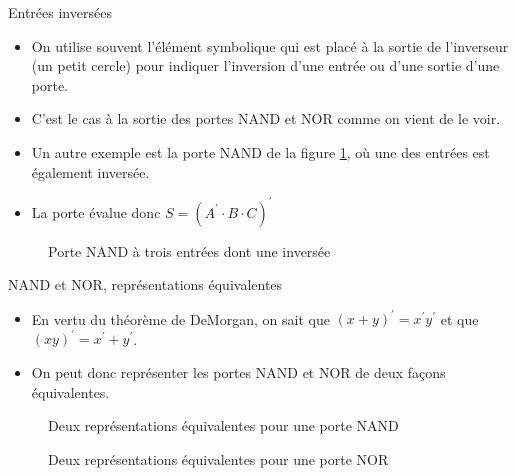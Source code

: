 \documentclass[presentation]{beamer}
\begin{document}
\begin{frame}[label={sec:orge39c8d5}]{Entrées inversées}
\begin{itemize}
\item On utilise souvent l'élément symbolique qui est placé à la sortie de l'inverseur (un petit cercle) pour indiquer l'inversion d'une entrée ou d'une sortie d'une porte.

\item C'est le cas à la sortie des portes NAND et NOR comme on vient de le voir.

\item Un autre exemple est la porte NAND de la figure \ref{fig:org8edaf9f}, où une des entrées est également inversée.

\item La porte évalue donc \(S = (A^\prime \cdot B \cdot C)^\prime\)
\end{itemize}

\begin{figure}[htbp]
\centering

\caption{\label{fig:org8edaf9f}Porte NAND à trois entrées dont une inversée}
\end{figure} 
\end{frame}

\begin{frame}[label={sec:orgfa1fb1e}]{NAND et NOR, représentations équivalentes}
\begin{itemize}
\item En vertu du théorème de DeMorgan, on sait que \((x + y)^{\prime} = x^{\prime} y^{\prime}\) et que \((xy)^{\prime} = x^{\prime} + y^{\prime}\).

\item On peut donc représenter les portes NAND et NOR de deux façons équivalentes.
\end{itemize}

\begin{figure}[htbp]
\centering

\caption{\label{fig:orgbe0f568}Deux représentations équivalentes pour une porte NAND}
\end{figure}

\begin{figure}[htbp]
\centering

\caption{\label{fig:orga7fa8b3}Deux représentations équivalentes pour une porte NOR}
\end{figure}
\end{frame}
\end{document}
